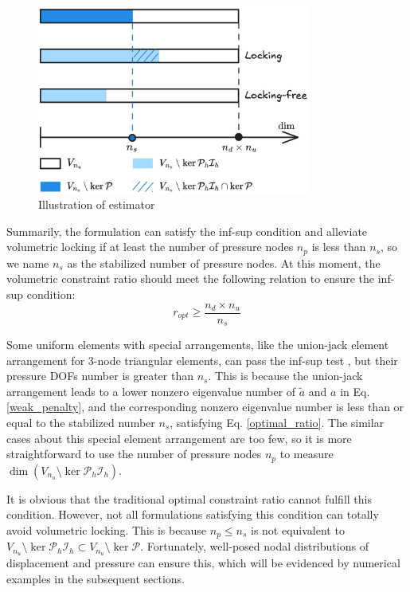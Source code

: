 \begin{figure}[!ht]
\centering
\includegraphics[width=0.8\textwidth]{png/space.png}
\caption{Illustration of estimator}\label{fg:space}
\end{figure}

Summarily, the formulation can satisfy the inf-sup condition and alleviate volumetric locking if at least the number of pressure nodes $n_p$ is less than $n_s$, so we name $n_s$ as the stabilized number of pressure nodes. At this moment, the volumetric constraint ratio should meet the following relation to ensure the inf-sup condition:
\begin{equation}\label{optimal_ratio}
r_{opt} \ge \frac{n_d \times n_u}{n_s}
\end{equation}

\begin{rmk}
Some uniform elements with special arrangements, like the union-jack element arrangement for 3-node triangular elements, can pass the inf-sup test \cite{chapelle1993}, but their pressure DOFs number is greater than $n_s$. This is because the union-jack arrangement leads to a lower nonzero eigenvalue number of $\tilde{a}$ and $a$ in Eq. \eqref{weak_penalty}, and the corresponding nonzero eigenvalue number is less than or equal to the stabilized number $n_s$, satisfying Eq. \eqref{optimal_ratio}. The similar cases about this special element arrangement are too few, so it is more straightforward to use the number of pressure nodes $n_p$ to measure $\dim (V_{n_u} \setminus \ker \mathcal{P}_h \mathcal{I}_h)$.
\end{rmk}

\begin{rmk}
It is obvious that the traditional optimal constraint ratio cannot fulfill this condition. However, not all formulations satisfying this condition can totally avoid volumetric locking. This is because $n_p \le n_s$ is not equivalent to $V_{n_u} \setminus \ker \mathcal{P}_h \mathcal{I}_h \subset V_{n_u} \setminus \ker \mathcal{P}$. Fortunately, well-posed nodal distributions of displacement and pressure can ensure this, which will be evidenced by numerical examples in the subsequent sections.
\end{rmk}


